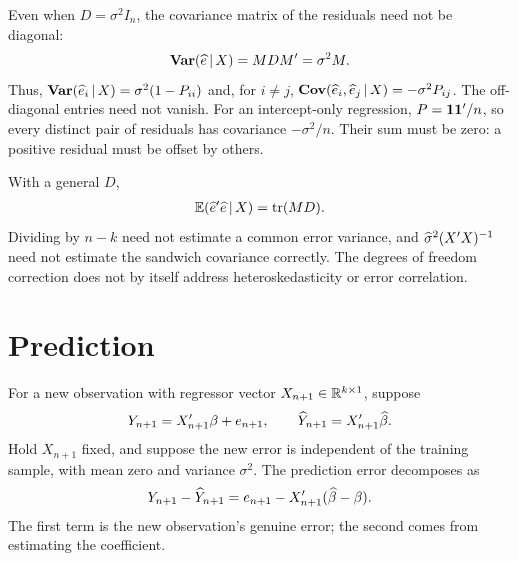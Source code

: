 \documentclass[a4paper,12pt]{article}
\begin{document}
\begin{remark}
	Even when $D=\sigma^2 I_n$,
	the covariance matrix of the residuals need not be diagonal:
	\begin{align}\label{eq-residual-covariance}
		\operatorname{\text{\textrm{\upshape\textbf{Var}}}}(\widehat e\mathpunct{}|\mathpunct{} X)=MDM^{\prime}=\sigma^2M.
	\end{align}
	Thus, $\operatorname{\text{\textrm{\upshape\textbf{Var}}}}(\widehat e_i\mathpunct{}|\mathpunct{} X)=\sigma^2(1-P_{ii})$ and, for $i\ne j$,
	$\operatorname{\text{\textrm{\upshape\textbf{Cov}}}}(\widehat e_i,\widehat e_j\mathpunct{}|\mathpunct{} X)=-\sigma^2P_{ij}$.
	The off-diagonal entries need not vanish.
	For an intercept-only regression, $P=\mathbf{1}\mathbf{1}^{\prime}/n$, so every distinct pair of residuals has covariance $-\sigma^2/n$.
	Their sum must be zero: a positive residual must be offset by others.
\end{remark}

\begin{remark}
	With a general $D$,
	\begin{align*}
		\operatorname{\mathbb{E}}(\widehat e^{\prime}\widehat e\mathpunct{}|\mathpunct{} X)=\operatorname{tr}(MD).
	\end{align*}
	Dividing by $n-k$ need not estimate a common error variance, and $\widehat\sigma^2(X^{\prime} X)^{-1}$ need not estimate the sandwich covariance correctly.
	The degrees of freedom correction does not by itself address heteroskedasticity or error correlation.
\end{remark}

\section{Prediction}

For a new observation with regressor vector $X_{n+1}\in\mathbb{R}^{k\times 1}$, suppose
\begin{align*}
	Y_{n+1}=X_{n+1}^{\prime}\beta+e_{n+1},
	\qquad \widehat Y_{n+1}=X_{n+1}^{\prime}\widehat\beta.
\end{align*}
Hold $X_{n+1}$ fixed, and suppose the new error is independent of the training sample,
with mean zero and variance $\sigma^2$.
The prediction error decomposes as
\begin{align}\label{eq-prediction-error}
	Y_{n+1}-\widehat Y_{n+1}
	=e_{n+1}-X_{n+1}^{\prime}(\widehat\beta-\beta).
\end{align}
The first term is the new observation's genuine error; the second comes from estimating the coefficient.
\end{document}
